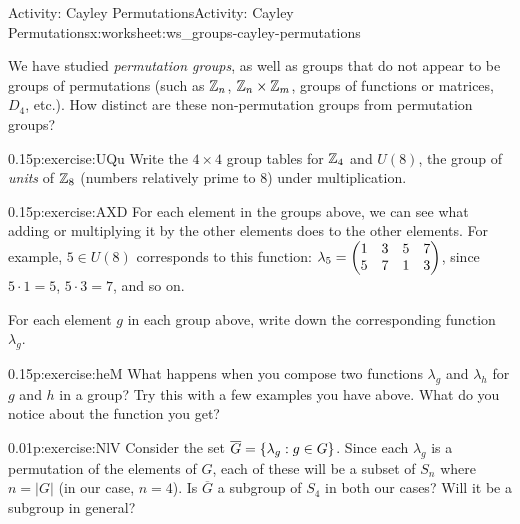 \documentclass[11pt]{book}
\begin{document}
%
%
\typeout{************************************************}
\typeout{************************************************}
%
\begin{worksheet-subsection}{Activity: Cayley Permutations}{}{Activity: Cayley Permutations}{}{}{x:worksheet:ws_groups-cayley-permutations}
\begin{introduction}{}%
We have studied \emph{permutation groups}, as well as groups that do not appear to be groups of permutations (such as \(\mathbb{Z}_n\), \(\mathbb{Z}_n\times \mathbb{Z}_m\), groups of functions or matrices, \(D_4\), etc.).  How distinct are these non-permutation groups from permutation groups?%
\end{introduction}%
\begin{divisionexercise}{1}{}{0.15}{p:exercise:UQu}%
Write the \(4\times 4\) group tables for \(\mathbb{Z}_4\) and  \(U(8)\), the group of \emph{units}  of \(\mathbb{Z}_8\) (numbers relatively prime to 8) under multiplication.%
\end{divisionexercise}%
\begin{divisionexercise}{2}{}{0.15}{p:exercise:AXD}%
For each element in the groups above, we can see what adding or multiplying it by the other elements does to the other elements.  For example, \(5 \in U(8)\) corresponds to this function: \(\lambda_5 = \begin{pmatrix}1 & 3 & 5 & 7\\ 5 & 7 & 1 & 3\end{pmatrix}\), since \(5 \cdot 1 = 5 \), \(5 \cdot 3 = 7\), and so on.%
\par
For each element \(g\) in each group above, write down the corresponding function \(\lambda_g\).%
\end{divisionexercise}%
\begin{divisionexercise}{3}{}{0.15}{p:exercise:heM}%
What happens when you compose two functions \(\lambda_g\) and \(\lambda_h\) for \(g\) and \(h\) in a group?  Try this with a few examples you have above.  What do you notice about the function you get?%
\end{divisionexercise}%
\begin{divisionexercise}{4}{}{0.01}{p:exercise:NlV}%
Consider the set \(\overline{G} = \{\lambda_g : g \in G\}\).  Since each \(\lambda_g\) is a permutation of the elements of \(G\), each of these will be a subset of \(S_n\) where \(n = |G|\) (in our case, \(n=4\)).  Is \(\overline{G}\) a subgroup of \(S_4\) in both our cases?  Will it be a subgroup in general?%
\end{divisionexercise}%
\end{worksheet-subsection}
\restoregeometry
\end{document}

